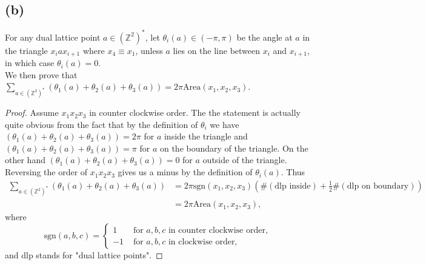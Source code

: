 \documentclass[a4paper,11pt]{article}
\newcommand{\Z}{\mathbb{Z}}
\newcommand{\Area}{\text{Area}}
\numberwithin{equation}{section}
\begin{document}
	\subsection*{(b)}
	For any dual lattice point $ a\in(\Z^2)^* $, let $ \theta_i(a)\in(-\pi,\pi) $ be the angle at $ a $ in the triangle $ x_iax_{i+1} $ where $ x_4\equiv x_1 $, unless $ a $ lies on the line between $ x_i $ and $ x_{i+1} $, in which case $ \theta_i(a)=0 $.\\
	We then prove that $ \sum_{a\in(\Z^2)^*}\left(\theta_1(a)+\theta_2(a)+\theta_3(a)\right)=2\pi\Area(x_1,x_2,x_3) $. \begin{proof}
		Assume $ x_1x_2x_3 $ in counter clockwise order.
		The the statement is actually quite obvious from the fact that by the definition of $ \theta_i $ we have $ (\theta_1(a)+\theta_2(a)+\theta_3(a))=2\pi $ for $ a $ inside the triangle and  $ (\theta_1(a)+\theta_2(a)+\theta_3(a))=\pi $ for $ a $ on the boundary of the triangle. On the other hand $ (\theta_1(a)+\theta_2(a)+\theta_3(a))=0 $ for $ a $ outside of the triangle. Reversing the order of $ x_1x_2x_3 $ gives us a minus by the definition of $ \theta_i(a) $. Thus \begin{equation}
		\begin{aligned}
		\sum_{a\in(\Z^2)^*}\left(\theta_1(a)+\theta_2(a)+\theta_3(a)\right)&=2\pi\text{sgn}(x_1,x_2,x_3)\left(\#(\text{dlp inside})+\frac{1}{2}\#(\text{dlp on boundary})\right)\\&=2\pi\Area(x_1,x_2,x_3),
		\end{aligned}
		\end{equation}
		where \begin{equation}
		\text{sgn}(a,b,c)=\begin{cases}
		1& \text{ for }a,b,c\text{ in counter clockwise order,}\\
		-1& \text{ for }a,b,c\text{ in clockwise order,}
		\end{cases}
		\end{equation} and dlp stands for "dual lattice points".
	\end{proof} 
\end{document}
